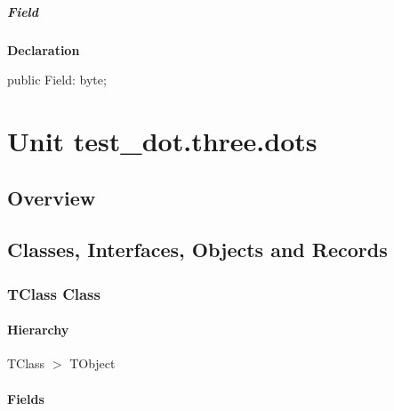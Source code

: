 \documentclass{report}
\begin{document}
\paragraph*{Field}\hspace*{\fill}

\begin{list}{}{
\setlength{\itemindent}{0cm}
\setlength{\listparindent}{0cm}
\setlength{\leftmargin}{\evensidemargin}
\addtolength{\leftmargin}{\tmplength}
\settowidth{\labelsep}{X}
\addtolength{\leftmargin}{\labelsep}
\setlength{\labelwidth}{\tmplength}
}
\begin{flushleft}
\item[\textbf{Declaration}\hfill]
\begin{ttfamily}
public Field: byte;\end{ttfamily}


\end{flushleft}
\end{list}
\chapter{Unit test{\_}dot.three.dots}
\section{Overview}
\begin{description}
\item[\texttt{\begin{ttfamily}TClass\end{ttfamily} Class}]
\end{description}
\section{Classes, Interfaces, Objects and Records}
\subsection*{TClass Class}
\subsubsection*{\large{\textbf{Hierarchy}}\normalsize\hspace{1ex}\hfill}
TClass {$>$} TObject
\subsubsection*{\large{\textbf{Fields}}\normalsize\hspace{1ex}\hfill}
\end{document}
